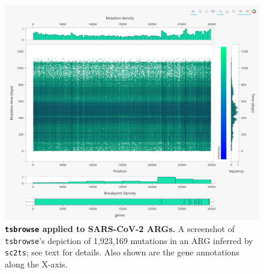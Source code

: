 \documentclass[unnumsec,webpdf,contemporary,large,namedate]{oup-authoring-template}%
\begin{document}
\begin{figure}
    \centering
    \includegraphics[width=0.95\linewidth]{figures/SuppFig4.png}
    \caption{\textbf{\texttt{tsbrowse} applied to SARS-CoV-2 ARGs.}
        A screenshot of \texttt{tsbrowse}'s depiction of
        1,923,169 mutations in an
        ARG inferred by \texttt{sc2ts}; see  text for details. Also shown are the
        gene annotations along the X-axis.}
    \label{fig:Supplementary_Figure_4}
\end{figure}
\end{document}

